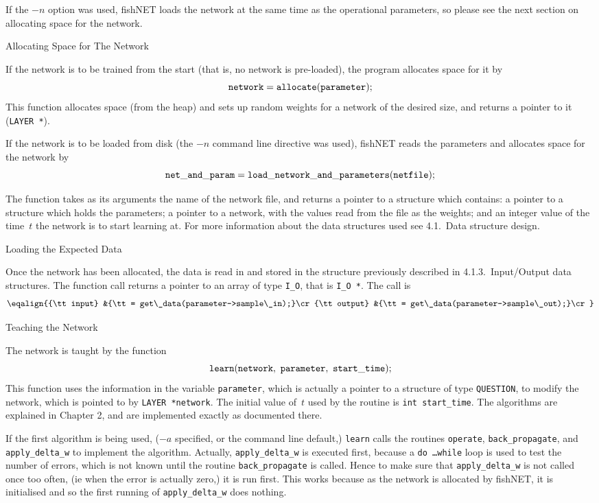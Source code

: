If the $-n$ option was used, fishNET loads the network at the same
time as the operational parameters, so please see the next section
on allocating space for the network.

\sssec Allocating Space for The Network

If the network is to be trained from the start (that is, no network
is pre-loaded), the program allocates space for it by
$$
	{\tt network = allocate(parameter);}
$$
This function allocates space (from the heap) and sets up random
weights for a network of the desired size, and returns a pointer to
it ({\tt LAYER *}).

If the network is to be loaded from disk (the $-n$ command line
directive was used), fishNET reads the parameters and allocates
space for the network by
$$
	{\tt net\_and\_param = load\_network\_and\_parameters(netfile);}
$$

The function takes as its arguments the name of the network file,
and returns a pointer to a structure which contains: a pointer to a
structure which holds the parameters; a pointer to a network, with
the values read from the file as the weights; and an integer value
of the time~$t$ the network is to start learning at.
For more information about the data structures used see 4.1.~Data 
structure design.

\sssec Loading the Expected Data

Once the network has been allocated, the data is read in and stored
in the structure previously described in 4.1.3.~Input/Output data
structures.
The function call returns a pointer to an array of type {\tt I\_O},
that is {\tt I\_O *}.
The call is
$$
\eqalign{{\tt input} &{\tt = get\_data(parameter->sample\_in);}\cr
	{\tt output} &{\tt = get\_data(parameter->sample\_out);}\cr
}$$

\sssec Teaching the Network

The network is taught by the function
$$
	{\tt learn(network,\ parameter,\ start\_time);}
$$
This function uses the information in the variable {\tt parameter},
which is actually a pointer to a structure of type {\tt QUESTION},
to modify the network, which is pointed to by {\tt LAYER *network}.
The initial value of~$t$ used by the routine is {\tt int
start\_time}.
The algorithms are explained in Chapter 2, and are implemented exactly
as documented there.

If the first algorithm is being used, ($-a$ specified, or the command
line default,) {\tt learn} calls the routines
{\tt operate}, {\tt back\_propagate}, and {\tt apply\_delta\_w} to
implement the algorithm.
Actually, {\tt apply\_delta\_w} is executed first, because a {\tt do
\dots while} loop is used to test the number of errors, which is not
known until the routine {\tt back\_propagate} is called.
Hence to make sure that {\tt apply\_delta\_w} is not called once too
often, (ie when the error is actually zero,) it is run first.
This works because as the network is allocated by fishNET, it is 
initialised and so the first running of {\tt apply\_delta\_w} does
nothing.

